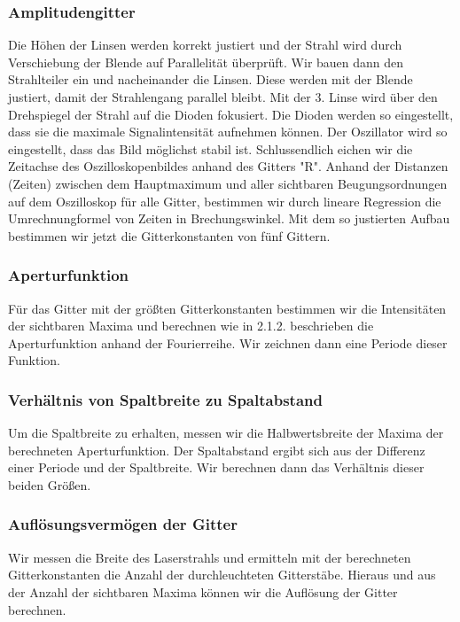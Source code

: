 \subsubsection{Amplitudengitter}

Die H\"ohen der Linsen werden korrekt justiert und der Strahl wird durch Verschiebung der Blende auf Parallelit\"at \"uberpr\"uft. Wir bauen dann den Strahlteiler ein und nacheinander die Linsen. Diese werden mit der Blende justiert, damit der Strahlengang parallel bleibt. Mit der 3. Linse wird über den Drehspiegel der Strahl auf die Dioden fokusiert. Die Dioden werden so eingestellt, dass sie die maximale Signalintensit\"at aufnehmen k\"onnen. Der Oszillator wird so eingestellt, dass das Bild m\"oglichst stabil ist. Schlussendlich eichen wir die Zeitachse des Oszilloskopenbildes anhand des Gitters "R". Anhand der Distanzen (Zeiten) zwischen dem Hauptmaximum und aller sichtbaren Beugungsordnungen auf dem Oszilloskop f\"ur alle Gitter, bestimmen wir durch lineare Regression die Umrechnungformel von Zeiten in Brechungswinkel.
Mit dem so justierten Aufbau bestimmen wir jetzt die Gitterkonstanten von fünf Gittern.

\subsubsection{Aperturfunktion}
Für das Gitter mit der größten Gitterkonstanten bestimmen wir die Intensitäten der sichtbaren Maxima und berechnen wie in 2.1.2. beschrieben die Aperturfunktion anhand der Fourierreihe. Wir zeichnen dann eine Periode dieser Funktion.

\subsubsection{Verh\"altnis von Spaltbreite zu Spaltabstand}

Um die Spaltbreite zu erhalten, messen wir die Halbwertsbreite der Maxima der berechneten Aperturfunktion. Der Spaltabstand ergibt sich aus der Differenz einer Periode und der Spaltbreite. Wir berechnen dann das Verh\"altnis dieser beiden Gr\"o\ss en.

\subsubsection{Aufl\"osungsverm\"ogen der Gitter}

Wir messen die Breite des Laserstrahls und ermitteln mit der berechneten Gitterkonstanten die Anzahl der durchleuchteten Gitterst\"abe. Hieraus und aus der Anzahl der sichtbaren Maxima k\"onnen wir die Aufl\"osung der Gitter berechnen.



